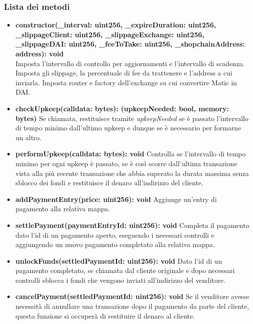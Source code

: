 \documentclass[a4paper, 12pt]{article}
\begin{document}
\subsubsection{Lista dei metodi}
\begin{itemize}
    \item \textbf{constructor(\_interval: uint256, \_expireDuration: uint256, \_slippageClient: uint256, \_slippageExchange: uint256, \_slippageDAI: uint256, \_feeToTake: uint256, \_shopchainAddress: address): void}
    \\Imposta l'intervallo di controllo per aggiornamenti e l'intervallo di scadenza.
    Imposta gli slippage, la percentuale di fee da trattenere e l'address a cui inviarla.
    Imposta router e factory dell'exchange su cui convertire Matic in DAI.\\
    \item \textbf{checkUpkeep(calldata: bytes): (upkeepNeeded: bool, memory: bytes)}
    Se chiamata, restituisce tramite \textit{upkeepNeeded} se è passato l'intervallo di tempo minimo dall'ultimo upkeep e dunque se è necessario per formarne un altro.\\
    \item \textbf{performUpkeep(calldata: bytes): void}
    Controlla se l'intervallo di tempo minimo per ogni upkeep è passato, se è così scorre dall'ultima transazione vista alla più recente transazione che abbia superato la durata massima senza sblocco dei fondi
    e restituisce il denaro all'indirizzo del cliente.\\
    \item \textbf{addPaymentEntry(price: uint256): void}
    Aggiunge un'entry di pagamento alla relativa mappa.\\
    \item \textbf{settlePayment(paymentEntryId: uint256): void}
    Completa il pagamento dato l'id di un pagamento aperto, eseguendo i necessari controlli e aggiungendo un nuovo pagamento completato alla relativa mappa.\\
    \item \textbf{unlockFunds(settledPaymentId: uint256): void}
    Dato l'id di un pagamento completato, se chiamata dal cliente originale e dopo necessari controlli sblocca i fondi che vengono inviati all'indirizzo del venditore.\\
    \item \textbf{cancelPayment(settledPaymentId: uint256): void}
    Se il venditore avesse necessità di annullare una transazione dopo il pagamento da parte del cliente, questa funzione si occuperà di restituire il denaro al cliente.\\

\end{itemize}
\end{document}
